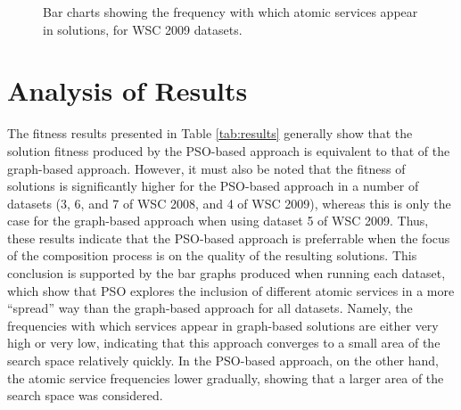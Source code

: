 \documentclass{llncs}
\begin{document}
\begin{figure}[h]
\centerline{
}
 \caption{Bar charts showing the frequency with which atomic services appear in solutions, for WSC 2009 datasets.}
 \label{bar_charts2009}
\end{figure}

\section{Analysis of Results} %

The fitness results presented in Table \ref{tab:results} generally show that the solution fitness produced by the PSO-based approach is equivalent to that of the graph-based approach. However, it must also be noted that the fitness of solutions is significantly higher for the PSO-based approach in a number of datasets (3, 6, and 7 of WSC 2008, and 4 of WSC 2009), whereas this is only the case for the graph-based approach when using dataset 5 of WSC 2009. Thus, these results indicate that the PSO-based approach is preferrable when the focus of the composition process is on the quality of the resulting solutions. This conclusion is supported by the bar graphs produced when running each dataset, which show that PSO explores the inclusion of different atomic services in a more ``spread'' way than the graph-based approach for all datasets. Namely, the frequencies with which services appear in graph-based solutions are either very high or very low, indicating that this approach converges to a small area of the search space relatively quickly. In the PSO-based approach, on the other hand, the atomic service frequencies lower gradually, showing that a larger area of the search space was considered.
\end{document}
